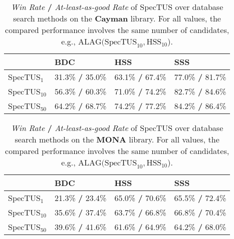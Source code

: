 \begin{table}[h!]
    \centering
    \begin{tabular}{l|l|l|l}
    
        ~ & BDC & HSS & SSS \\ \hline
        SpecTUS$_1$ & 31.3\% \textbf{/} 35.0\% & 63.1\% \textbf{/} 67.4\% & 77.0\% \textbf{/} 81.7\% \\ \hline
        SpecTUS$_{10}$ & 56.3\% \textbf{/} 60.3\%& 71.0\% \textbf{/} 74.2\%& 82.7\% \textbf{/} 84.6\%\\ \hline
        SpecTUS$_{50}$ & 64.2\% \textbf{/} 68.7\%& 74.2\% \textbf{/} 77.2\%& 84.2\% \textbf{/} 86.4\%\\ \hline
    \end{tabular}
    \caption{\textit{Win Rate} \textbf{/} \textit{At-least-as-good Rate} of SpecTUS over database search methods on the \textbf{Cayman} library. For all values, the compared performance involves the same number of candidates, e.g., $\text{ALAG}(\text{SpecTUS}_{10}, \text{HSS}_{10}$).}
\end{table}

\begin{table}[h!]
    \centering
    \begin{tabular}{l|l|l|l}
    
        ~ & BDC & HSS & SSS \\ \hline
        SpecTUS$_1$ & 21.3\% \textbf{/} 23.4\%& 65.0\% \textbf{/} 70.6\%& 65.5\% \textbf{/} 72.4\%\\ \hline
        SpecTUS$_{10}$ & 35.6\% \textbf{/} 37.4\%& 63.7\% \textbf{/} 66.8\%& 66.8\% \textbf{/} 70.4\%\\ \hline
        SpecTUS$_{50}$ & 39.6\% \textbf{/} 41.6\%& 61.6\% \textbf{/} 64.9\%& 64.2\% \textbf{/} 68.0\%\\ \hline
    \end{tabular}
    \caption{\textit{Win Rate} \textbf{/} \textit{At-least-as-good Rate} of SpecTUS over database search methods on the \textbf{MONA} library. For all values, the compared performance involves the same number of candidates, e.g., $\text{ALAG}(\text{SpecTUS}_{10}, \text{HSS}_{10}$).}
    \label{tab:win_alag_nist}
\end{table}
% 

% 